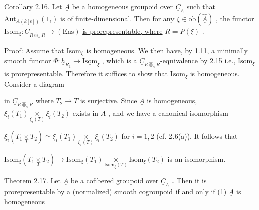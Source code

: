 \underline{Corollary} 2.16.  \underline{Let}  $\underline{A}$  \underline{be a homogeneous groupoid over}  $\underline{C}_{\wedge}$  \underline{such that} $\mathrm{Aut}_{\underline{A}(k[\epsilon])}(1_{\epsilon})$  \underline{is of finite-dimensional. Then for any}  $\xi \in \mathrm{ob}(\hat{\underline{A}})$  , \underline{the functor} $\mathrm{Isom}_{\xi} : \underline{C}_{R \hat{\otimes}_{\wedge} R} \longrightarrow (\mathrm{Ens})$  \underline{is prorepresentable, where}  $R = P(\xi)$  .

\underline{Proof}:  Assume that  $\mathrm{Isom}_{\xi}$  is homogeneous. We then have, by 1.11, a minimally smooth functor  $\Phi : \underline{h}_{R_{1}} \to \underline{\mathrm{Isom}}_{\xi}$  , which is a  $\underline{C}_{R \hat{\otimes}_{\wedge} R}$-equivalence by 2.15 i.e., $\mathrm{Isom}_{\xi}$  is prorepresentable. Therefore it suffices to show that  $\mathrm{Isom}_{\xi}$  is homogeneous. Consider a diagram

\begin{center}
\end{center}
in  $\underline{C}_{R \hat{\otimes}_{\wedge} R}$  where  $T_{2} \longrightarrow T$  is surjective. Since  $\underline{A}$  is homogeneous, $\xi_{i}(T_{1}) \underset{\xi_{i}(T)}{\times} \xi_{i}(T_{2})$  exists in  $\underline{A}$  , and we have a canonical isomorphism

$\xi_{i}(T_{1} \underset{T}{\times} T_{2}) \simeq \xi_{i}(T_{1}) \underset{\xi_{i}(T)}{\times} \xi_{i}(T_{2})$  for  $i = 1,2$  (cf. 2.6(a)). It follows that

$\mathrm{Isom}_{\xi}(T_{1} \underset{T}{\times} T_{2}) \longrightarrow \mathrm{Isom}_{\xi}(T_{1}) \underset{\mathrm{Isom}_{\xi}(T)}{\times} \mathrm{Isom}_{\xi}(T_{2})$  is an isomorphism.

\underline{Theorem} 2.17.  \underline{Let}  $\underline{A}$  \underline{be a cofibered groupoid over}  $\underline{C}_{\wedge}$  . \underline{Then it is prorepresentable by a (normalized) smooth cogroupoid if and only if}
(1)  $\underline{A}$  \underline{is homogeneous}


